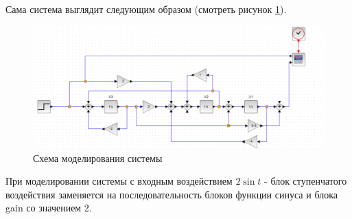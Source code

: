 \documentclass[a4paper, 12pt]{article}
\begin{document}
Сама система выглядит следующим образом (смотреть рисунок \ref{p:Схема3}).

\begin{figure}[h!]
	\centering
	\includegraphics[scale=0.6]{scheme3}
	\caption{Схема моделирования системы}
	\label{p:Схема3}
\end{figure}

При моделировании системы с входным воздействием $2 \sin{t}$ - блок ступенчатого воздействия заменяется на последовательность блоков функции синуса и блока gain со значением 2.
\end{document}
